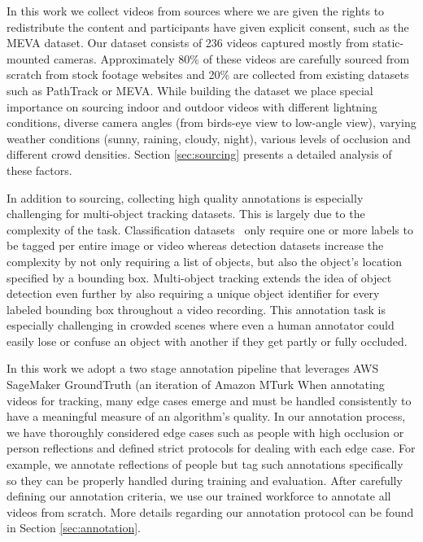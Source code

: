 \documentclass[runningheads]{llncs}
\begin{document}
In this work we collect videos from sources where we are given the rights to redistribute the content and participants have given explicit consent, such as the MEVA\cite{meva} dataset. 
Our dataset consists of 236 videos captured mostly from static-mounted cameras. Approximately 80$\%$ of these videos are carefully sourced from scratch from stock footage websites and 20$\%$ are collected from existing datasets such as PathTrack\cite{pathtrack} or MEVA\cite{meva}. 
While building the dataset we place special importance on sourcing indoor and outdoor videos with different lightning conditions, diverse camera angles (from birds-eye view to low-angle view), varying weather conditions (sunny, raining, cloudy, night), various levels of occlusion and different crowd densities.
Section \ref{sec:sourcing} presents a detailed analysis of these factors. 

In addition to sourcing, collecting high quality annotations is especially challenging for multi-object tracking datasets. This is largely due to the complexity of the task. Classification datasets~\cite{imagenet,kinetics} only require one or more labels to be tagged per entire image or video whereas detection datasets \cite{mscoco,pascal} increase the complexity by not only requiring a list of objects, but also the object's location specified by a bounding box. Multi-object tracking extends the idea of object detection even further by also requiring a unique object identifier for every labeled bounding box throughout a video recording. This annotation task is especially challenging in crowded scenes where even a human annotator could easily lose or confuse an object with another if they get partly or fully occluded. 

In this work we adopt a two stage annotation pipeline that leverages AWS SageMaker GroundTruth (an iteration of Amazon MTurk
When annotating videos for tracking, many edge cases emerge and must be handled consistently to have a meaningful measure of an algorithm's quality.
In our annotation process, we have thoroughly considered edge cases such as people with high occlusion or person reflections and defined strict protocols for dealing with each edge case. For example, we annotate reflections of people but tag such annotations specifically so they can be properly handled during training and evaluation. After carefully defining our annotation criteria, we use our trained workforce to annotate all videos from scratch.
More details regarding our annotation protocol can be found in Section \ref{sec:annotation}. 
\end{document}
